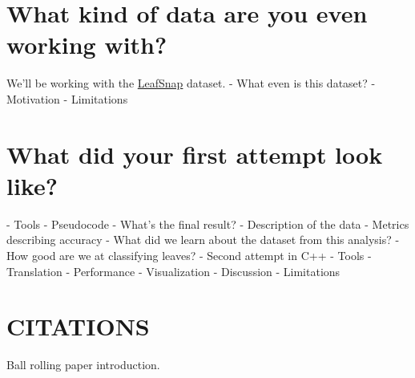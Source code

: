 \documentclass{article}
\begin{document}
\section{What kind of data are you even working with?}
We'll be working with the \href{http://leafsnap.com/dataset/}{LeafSnap} dataset.
- What even is this dataset?
	- Motivation
	- Limitations
	
\section{What did your first attempt look like?}
	- Tools
	- Pseudocode
- What's the final result?
	- Description of the data
	- Metrics describing accuracy
- What did we learn about the dataset from this analysis?
	- How good are we at classifying leaves?
- Second attempt in C++
	- Tools
	- Translation
	- Performance
	- Visualization
- Discussion
	- Limitations
\section*{CITATIONS}
Ball rolling paper introduction.
\end{document}
